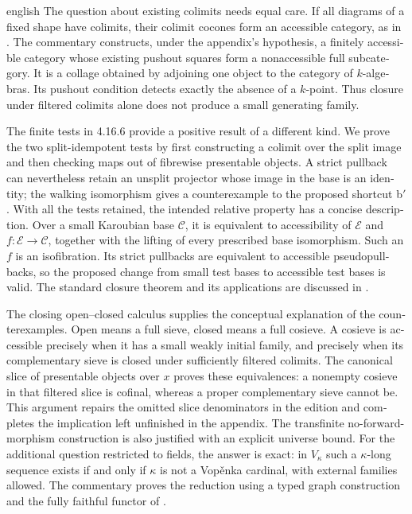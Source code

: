 \begin{otherlanguage}{english}
\begin{otherlanguage*}{english}
The question about existing colimits needs equal care. If all diagrams of a fixed shape have colimits, their colimit cocones form an accessible category, as in \citet[Example~5.4.7.9]{Lurie2009HTT}. The commentary constructs, under the appendix's hypothesis, a finitely accessible category whose existing pushout squares form a nonaccessible full subcategory. It is a collage obtained by adjoining one object to the category of $k$-algebras. Its pushout condition detects exactly the absence of a $k$-point. Thus closure under filtered colimits alone does not produce a small generating family.

The finite tests in 4.16.6 provide a positive result of a different kind. We prove the two split-idempotent tests by first constructing a colimit over the split image and then checking maps out of fibrewise presentable objects. A strict pullback can nevertheless retain an unsplit projector whose image in the base is an identity; the walking isomorphism gives a counterexample to the proposed shortcut b$'$. With all the tests retained, the intended relative property has a concise description. Over a small Karoubian base $\mathcal C$, it is equivalent to accessibility of $\mathcal E$ and $f:\mathcal E\to\mathcal C$, together with the lifting of every prescribed base isomorphism. Such an $f$ is an isofibration. Its strict pullbacks are equivalent to accessible pseudopullbacks, so the proposed change from small test bases to accessible test bases is valid. The standard closure theorem and its applications are discussed in \citet[Examples~4.8 and Remark~4.9, published version]{BourkeLack2024}.

The closing open--closed calculus supplies the conceptual explanation of the counterexamples. Open means a full sieve, closed means a full cosieve. A cosieve is accessible precisely when it has a small weakly initial family, and precisely when its complementary sieve is closed under sufficiently filtered colimits. The canonical slice of presentable objects over $x$ proves these equivalences: a nonempty cosieve in that filtered slice is cofinal, whereas a proper complementary sieve cannot be. This argument repairs the omitted slice denominators in the edition and completes the implication left unfinished in the appendix. The transfinite no-forward-morphism construction is also justified with an explicit universe bound. For the additional question restricted to fields, the answer is exact: in $V_\kappa$ such a $\kappa$-long sequence exists if and only if $\kappa$ is not a Vop\v{e}nka cardinal, with external families allowed. The commentary proves the reduction using a typed graph construction and the fully faithful functor of \citet{MillerPoonenSchoutensShlapentokh2018}.


\end{otherlanguage*}
\end{otherlanguage}
